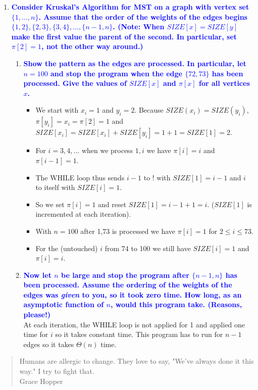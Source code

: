 \documentclass[11pt]{article}
\begin{document}
\begin{enumerate}
\item \textbf{\textcolor{blue}{Consider Kruskal's Algorithm for MST on a graph with vertex set
$\{1,\ldots,n\}$.  Assume that the order of the weights of the edges
begins $\{1,2\}, \{2,3\}, \{3,4\},\ldots, \{n-1,n\}$.  (Note: When 
$SIZE[x]=SIZE[y]$ make the first value the parent of the second.
In particular, set $\pi[2]=1$, not the other way around.)}}
    \begin{enumerate}
    \item \textbf{\textcolor{blue}{Show the pattern as the edges are processed.  In particular,
    let $n=100$ and stop the program when the edge $\{72,73\}$ has
    been processed.  Give the values of $SIZE[x]$ and $\pi[x]$ for all
    vertices $x$.}}
        \begin{itemize}
            \item We start with $x_i = 1$ and $y_i = 2$. Because $SIZE(x_i) = SIZE(y_i)$, $\pi[y_i] = x_i= \pi[2] = 1$ and $SIZE[x_i] = SIZE[x_i] + SIZE[y_i] = 1 + 1 = SIZE[1] = 2$. 
            \item For $i = 3,4,...$ when we process $1,i$ we have $\pi[i] = i$ and $\pi[i - 1] = 1$.
            \item The WHILE loop thus sends $i-1$ to ! with $SIZE[1] = i-1$ and $i$ to itself with $SIZE[i] = 1$.
            \item So we set $\pi[i] = 1$ and reset $SIZE[1] = i-1+1 = i$.
            ($SIZE[1]$ is incremented at each iteration).
            \item With $n=100$ after {1,73} is processed we have $\pi[i] = 1$ for $2 \leq i \leq 73$.
            \item For the (untouched) $i$ from 74 to 100 we still have $SIZE[i] = 1$ and $\pi[i] = i$.
        \end{itemize}
    \item \textbf{\textcolor{blue}{Now let $n$ be large and stop the program after $\{n-1,n\}$ has
    been processed.  Assume the ordering of the weights of the edges
    was {\em given} to you, so it took zero time.  How long, as an
    asymptotic function of $n$, would this program take.  (Reasons, please!)}}
        \\ At each iteration, the WHILE loop is not applied for 1 and applied one time for $i$ so it takes constant time. This program has to run for $n - 1$ edges so it takes $\Theta(n)$ time.
    \end{enumerate}

\end{enumerate}

\begin{quote}
Humans are allergic to change.  They love to say, "We've always done it this way."
I try to fight that.
\\ Grace Hopper
\end{quote}
\end{document}
